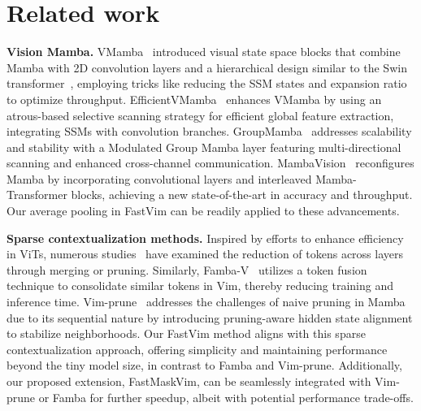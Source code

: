 \section{Related work}
\label{sec:related work}


\noindent \textbf{Vision Mamba.} VMamba~\cite{vmamba} introduced visual state space blocks that combine Mamba with 2D convolution layers and a hierarchical design similar to the Swin transformer~\cite{liu2021swin}, employing tricks like reducing the SSM states and expansion ratio to optimize throughput. EfficientVMamba~\cite{efficientvmamba} enhances VMamba by using an atrous-based selective scanning strategy for efficient global feature extraction, integrating SSMs with convolution branches. GroupMamba~\cite{groupmamba} addresses scalability and stability with a Modulated Group Mamba layer featuring multi-directional scanning and enhanced cross-channel communication. MambaVision~\cite{mambavision} reconfigures Mamba by incorporating convolutional layers and interleaved Mamba-Transformer blocks, achieving a new state-of-the-art in accuracy and throughput. Our average pooling in FastVim can be readily applied to these advancements.


\noindent \textbf{Sparse contextualization methods.} Inspired by efforts to enhance efficiency in ViTs, numerous studies~\cite{ryoo2021tokenlearner, hou2022token, bolya2022token, renggli2022learning, liang2022not, rao2021dynamicvit} have examined the reduction of tokens across layers through merging or pruning. Similarly, Famba-V~\cite{famba} utilizes a token fusion technique to consolidate similar tokens in Vim, thereby reducing training and inference time. Vim-prune~\cite{zhan2024exploring, zhan2024rethinking} addresses the challenges of naive pruning in Mamba due to its sequential nature by introducing pruning-aware hidden state alignment to stabilize neighborhoods. Our FastVim method aligns with this sparse contextualization approach, offering simplicity and maintaining performance beyond the tiny model size, in contrast to Famba and Vim-prune. Additionally, our proposed extension, FastMaskVim, can be seamlessly integrated with Vim-prune or Famba for further speedup, albeit with potential performance trade-offs. 
